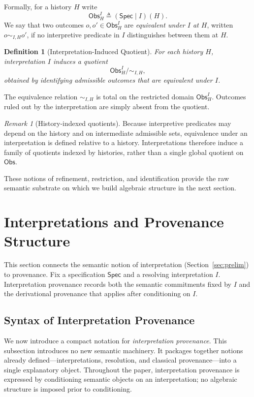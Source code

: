 \documentclass[acmsmall,nonacm]{acmart}
\newtheorem{definition}{Definition}
\theoremstyle{remark}
\newtheorem{remark}{Remark}
\numberwithin{definition}{section}
\numberwithin{theorem}{section}
\numberwithin{lemma}{section}
\numberwithin{corollary}{section}
\numberwithin{remark}{section}
\numberwithin{example}{section}
\numberwithin{observation}{section}
\numberwithin{assumption}{section}
\newcommand{\Obs}{\mathsf{Obs}}
\newcommand{\Spec}{\mathsf{Spec}}
\begin{document}
Formally, for a history $H$ write
\[
  \Obs_H^I \triangleq (\Spec \mid I)(H).
\]
We say that two outcomes $o,o' \in \Obs_H^I$ are \emph{equivalent under $I$ at $H$},
written $o \sim_{I,H} o'$, if no interpretive predicate in $I$ distinguishes between them at $H$.

\begin{definition}[Interpretation-Induced Quotient]
For each history $H$, interpretation $I$ induces a quotient
\[
  \Obs_H^I \big/ {\sim_{I,H}},
\]
obtained by identifying admissible outcomes that are equivalent under $I$.
\end{definition}

The equivalence relation $\sim_{I,H}$ is total on the restricted domain $\Obs_H^I$.
Outcomes ruled out by the interpretation are simply absent from the quotient.

\begin{remark}[History-indexed quotients]
Because interpretive predicates may depend on the history and on intermediate
admissible sets, equivalence under an interpretation is defined relative to a
history.
Interpretations therefore induce a family of quotients indexed by histories,
rather than a single global quotient on $\Obs$.
\end{remark}

These notions of refinement, restriction, and identification provide the raw
semantic substrate on which we build algebraic structure in the next section.


\section{Interpretations and Provenance Structure}
\label{sec:conditional-semiring}
This section connects the semantic notion of interpretation
(Section~\ref{sec:prelim}) to provenance.
Fix a specification $\Spec$ and a resolving interpretation $I$.
Interpretation provenance records both the semantic commitments fixed by $I$ and
the derivational provenance that applies after conditioning on $I$.

\subsection{Syntax of Interpretation Provenance}

We now introduce a compact notation for \emph{interpretation provenance}.
This subsection introduces no new semantic machinery.
It packages together notions already defined—interpretations, resolution, and
classical provenance—into a single explanatory object.
Throughout the paper, interpretation provenance is expressed by conditioning semantic objects on an interpretation; no algebraic structure is imposed prior to conditioning.
\end{document}
